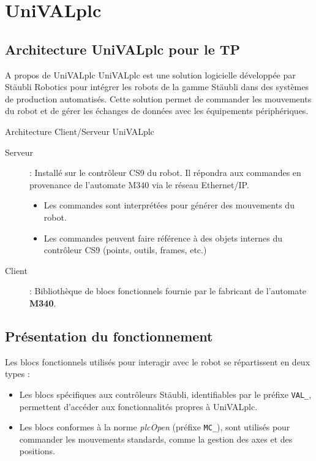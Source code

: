 
\section{UniVALplc}
\subsection{Architecture UniVALplc pour le TP}
\begin{UPSTIinfor}{A propos de UniVALplc}
    UniVALplc est une solution logicielle développée par Stäubli Robotics pour intégrer les robots de la gamme Stäubli dans des systèmes de production automatisés. Cette solution permet de commander les mouvements du robot et de gérer les échanges de données avec les équipements périphériques.
\end{UPSTIinfor}
\begin{UPSTIinfor}{Architecture Client/Serveur UniVALplc}
\begin{description}
    \item[Serveur] : Installé sur le contrôleur CS9 du robot. Il répondra aux commandes en provenance de l'automate M340 via le réseau Ethernet/IP.
    \begin{itemize}
        \item Les commandes sont interprétées pour générer des mouvements du robot.
        \item Les commandes peuvent faire référence à des objets internes du contrôleur CS9 (points, outils, frames, etc.)
    \end{itemize}
    \item[Client] : Bibliothèque de blocs fonctionnels fournie par le fabricant de l'automate \textbf{M340}. 
\end{description}
\end{UPSTIinfor}

\subsection{Présentation du fonctionnement}
Les blocs fonctionnels utilisés pour interagir avec le robot se répartissent en deux types :
\begin{itemize}
    \item Les blocs spécifiques aux contrôleurs Stäubli, identifiables par le préfixe \texttt{VAL\_}, permettent d'accéder aux fonctionnalités propres à UniVALplc.
    \item Les blocs conformes à la norme \textit{plcOpen} (préfixe \texttt{MC\_}), sont utilisés pour commander les mouvements standards, comme la gestion des axes et des positions.
\end{itemize}

